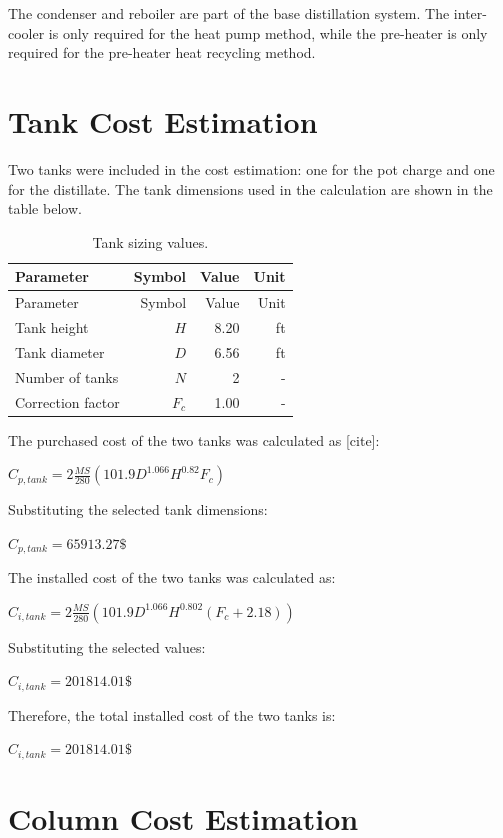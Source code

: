 The condenser and reboiler are part of the base distillation system. The
inter-cooler is only required for the heat pump method, while the
pre-heater is only required for the pre-heater heat recycling method.

\section{Tank Cost Estimation}\label{tank-cost-estimation}

Two tanks were included in the cost estimation: one for the pot charge
and one for the distillate. The tank dimensions used in the calculation
are shown in the table below.

\begin{longtable}[]{@{}lrrr@{}}
\caption{Tank sizing values.
\label{tab:Tank sizing values.}}\tabularnewline
\toprule\noalign{}
Parameter & Symbol & Value & Unit \\
\midrule\noalign{}
\endfirsthead
\toprule\noalign{}
Parameter & Symbol & Value & Unit \\
\midrule\noalign{}
\endhead
\bottomrule\noalign{}
\endlastfoot
Tank height & \(H\) & 8.20 & ft \\
Tank diameter & \(D\) & 6.56 & ft \\
Number of tanks & \(N\) & 2 & - \\
Correction factor & \(F_c\) & 1.00 & - \\
\end{longtable}

The purchased cost of the two tanks was calculated as {[}cite{]}:

\(C_{p,tank} = 2 \frac{MS}{280} \left(101.9 D^{1.066} H^{0.82} F_c \right)\)

Substituting the selected tank dimensions:

\(C_{p,tank} = 65913.27 \text{\$}\)

The installed cost of the two tanks was calculated as:

\(C_{i,tank} = 2 \frac{MS}{280} \left(101.9 D^{1.066} H^{0.802}(F_c + 2.18)\right)\)

Substituting the selected values:

\(C_{i,tank} = 201814.01 \text{\$}\)

Therefore, the total installed cost of the two tanks is:

\(C_{i,tank} = 201814.01 \text{\$}\)

\section{Column Cost Estimation}\label{column-cost-estimation}

